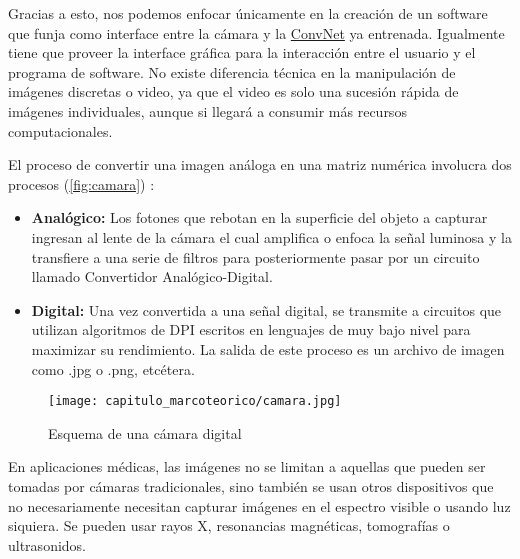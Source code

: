 Gracias a esto, nos podemos enfocar únicamente en la creación de un software que
funja como interface entre la cámara y la \hyperlink{abbr}{ConvNet} ya
entrenada. Igualmente tiene que proveer la interface gráfica para la interacción
entre el usuario y el programa de software. No existe diferencia técnica en la
manipulación de imágenes discretas o video, ya que el video es solo una sucesión
rápida de imágenes individuales, aunque si llegará a consumir más recursos
computacionales.

El proceso de convertir una imagen análoga en una matriz numérica involucra dos
procesos (\autoref{fig:camara}) \cite{Gries2010}:

\begin{itemize}
    \item{\textbf{Analógico:}} Los fotones que rebotan en la superficie del
    objeto a capturar ingresan al lente de la cámara el cual amplifica o enfoca
    la señal luminosa y la transfiere a una serie de filtros para posteriormente
    pasar por un circuito llamado Convertidor Analógico-Digital.
    \item{\textbf{Digital:}} Una vez convertida a una señal digital, se
    transmite a circuitos que utilizan algoritmos de DPI escritos en lenguajes
    de muy bajo nivel para maximizar su rendimiento. La salida de este proceso
    es un archivo de imagen como .jpg o .png, etcétera.
\end{itemize}

\begin{figure}[H]
    \centering
    \texttt{[image: capitulo\_marcoteorico/camara.jpg]}
    \caption{Esquema de una cámara digital}\label{fig:camara}
\end{figure}

En aplicaciones médicas, las imágenes no se limitan a aquellas que pueden ser
tomadas por cámaras tradicionales, sino también se usan otros dispositivos que
no necesariamente necesitan capturar imágenes en el espectro visible o usando
luz siquiera. Se pueden usar rayos X, resonancias magnéticas, tomografías o
ultrasonidos.



